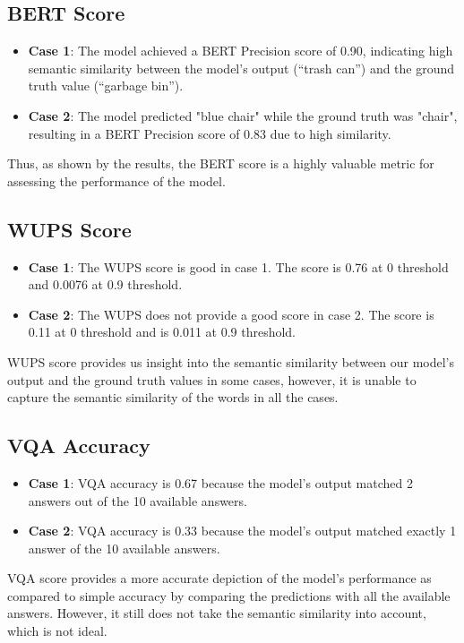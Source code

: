 \subsection{BERT Score}
\begin{itemize}
    \item \textbf{Case 1}: The model achieved a BERT Precision score of 0.90, indicating high semantic similarity between the model’s output (“trash can”) and the ground truth value (“garbage bin”).
    \item \textbf{Case 2}: The model predicted "blue chair" while the ground truth was "chair", resulting in a BERT Precision score of 0.83 due to high similarity.
\end{itemize}

Thus, as shown by the results, the BERT score is a highly valuable metric for assessing the performance of the model.

\subsection{WUPS Score}
\begin{itemize}
    \item \textbf{Case 1}: The WUPS score is good in case 1. The score is 0.76 at 0 threshold and 0.0076 at 0.9 threshold.
    \item \textbf{Case 2}: The WUPS does not provide a good score in case 2. The score is 0.11 at 0 threshold and is 0.011 at 0.9 threshold.
\end{itemize}

WUPS score provides us insight into the semantic similarity between our model’s output and the ground truth values in some cases, however, it is unable to capture the semantic similarity of the words in all the cases. 

\subsection{VQA Accuracy}
\begin{itemize}
    \item \textbf{Case 1}: VQA accuracy is 0.67 because the model’s output matched 2 answers out of the 10 available answers.
    \item \textbf{Case 2}: VQA accuracy is 0.33 because the model’s output matched exactly 1 answer of the 10 available answers.
\end{itemize}

VQA score provides a more accurate depiction of the model’s performance as compared to simple accuracy by comparing the predictions with all the available answers. However, it still does not take the semantic similarity into account, which is not ideal. 





